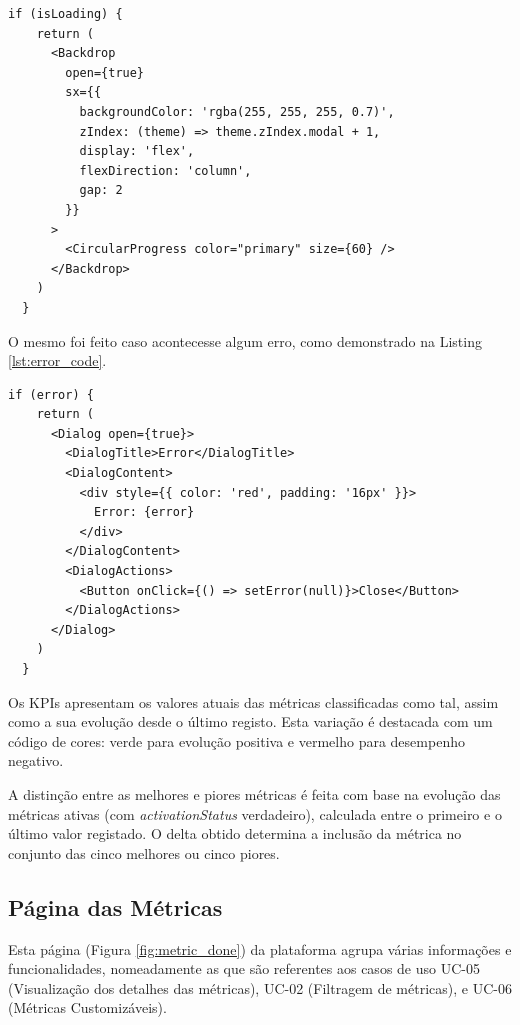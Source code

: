 \begin{lstlisting}[style=customts, caption={Componente mostrado no carregamento da página}, label={lst:loading_code}]
  if (isLoading) {
    return (
      <Backdrop
        open={true}
        sx={{
          backgroundColor: 'rgba(255, 255, 255, 0.7)',
          zIndex: (theme) => theme.zIndex.modal + 1,
          display: 'flex',
          flexDirection: 'column',
          gap: 2
        }}
      >
        <CircularProgress color="primary" size={60} />
      </Backdrop>
    )
  }
\end{lstlisting}

O mesmo foi feito caso acontecesse algum erro, como demonstrado na Listing \ref{lst:error_code}.

\begin{lstlisting}[style=customts, caption={Componente mostrado no caso de erro no carregamento da página}, label={lst:error_code}]
  if (error) {
    return (
      <Dialog open={true}>
        <DialogTitle>Error</DialogTitle>
        <DialogContent>
          <div style={{ color: 'red', padding: '16px' }}>
            Error: {error}
          </div>
        </DialogContent>
        <DialogActions>
          <Button onClick={() => setError(null)}>Close</Button>
        </DialogActions>
      </Dialog>
    )
  }
\end{lstlisting}

Os KPIs apresentam os valores atuais das métricas classificadas como tal, assim como a sua evolução desde o último registo. Esta variação é destacada com um código de cores: verde para evolução positiva e vermelho para desempenho negativo.

A distinção entre as melhores e piores métricas é feita com base na evolução das métricas ativas (com \textit{activationStatus} verdadeiro), calculada entre o primeiro e o último valor registado. O delta obtido determina a inclusão da métrica no conjunto das cinco melhores ou cinco piores.

\subsection{Página das Métricas}

Esta página (Figura \ref{fig:metric_done}) da plataforma agrupa várias informações e funcionalidades, nomeadamente as que são referentes aos casos de uso UC-05 (Visualização dos detalhes das métricas), UC-02 (Filtragem de métricas), e UC-06 (Métricas Customizáveis).

